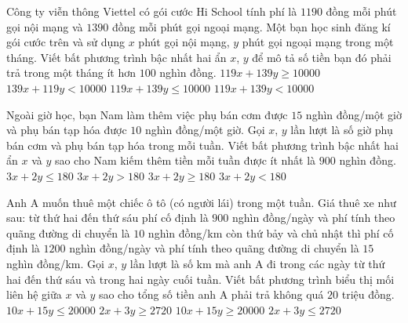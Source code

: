 \begin{ex}%
	Công ty viễn thông Viettel có gói cước Hi School tính phí là $1190$ đồng mỗi phút gọi nội mạng và $1390$ đồng mỗi phút gọi ngoại mạng. Một bạn học sinh đăng kí gói cước trên và sử dụng $x$ phút gọi nội mạng, $y$ phút gọi ngoại mạng trong một tháng. Viết bất phương trình bậc nhất hai ẩn $x$, $y$ để mô tả số tiền bạn đó phải trả trong một tháng ít hơn $100$ nghìn đồng.
	\choice
	{$119x+139y\ge 10000$}
	{$139x+119y< 10000$}
	{$119x+139y\le 10000$}
	{\True $119x+139y< 10000$}
\end{ex}

\begin{ex}%
	Ngoài giờ học, bạn Nam làm thêm việc phụ bán cơm được $15$ nghìn đồng/một giờ và phụ bán tạp hóa được $10$ nghìn đồng/một giờ. Gọi $x$, $y$ lần lượt là số giờ phụ bán cơm và phụ bán tạp hóa trong mỗi tuần. Viết bất phương trình bậc nhất hai ẩn $x$ và $y$ sao cho Nam kiếm thêm tiền mỗi tuần được ít nhất là $900$ nghìn đồng.
	\choice
	{$3x+2y\le 180$}
	{$3x+2y> 180$}
	{\True $3x+2y\ge 180$}
	{$3x+2y< 180$}
\end{ex}
\begin{ex}%
	Anh A muốn thuê một chiếc ô tô (có người lái) trong một tuần. Giá thuê xe như sau: từ thứ hai đến thứ sáu phí cố định là $900$ nghìn đồng/ngày và phí tính theo quãng đường di chuyển là $10$ nghìn đồng/km còn thứ bảy và chủ nhật thì phí cố định là $1200$ nghìn đồng/ngày và phí tính theo quãng đường di chuyển là $15$ nghìn đồng/km. Gọi $x$, $y$ lần lượt là số km mà anh A đi trong các ngày từ thứ hai đến thứ sáu và trong hai ngày cuối tuần. Viết bất phương trình biểu thị mối liên hệ giữa $x$ và $y$ sao cho tổng số tiền anh A phải trả không quá $20$ triệu đồng.
	\choice
	{$10x+15y\le 20000$}
	{$2x+3y\ge 2720$}
	{$10x+15y\ge 20000$}
	{\True $2x+3y\le 2720$}
\end{ex}
